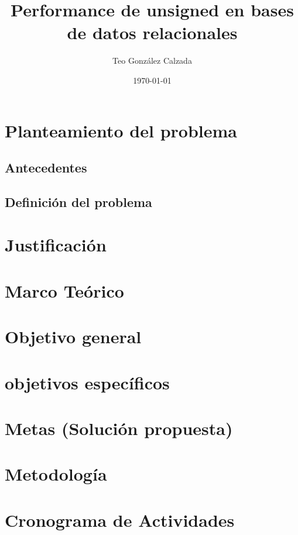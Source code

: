 \documentclass{article}
\title{Performance de unsigned en bases de datos relacionales} %
\author{Teo González Calzada} %
\date{\today}
\begin{document}


\clearpage
\clearpage

\clearpage




\section{Planteamiento del problema}
\subsection{Antecedentes}\label{sec:Ant}



\subsection{Definición del problema}

\section{Justificación}
\section{Marco Teórico}
\section{Objetivo general}
\section{objetivos específicos}
\section{Metas (Solución propuesta)}
\section{Metodología}
\section{Cronograma de Actividades}


\end{document}
